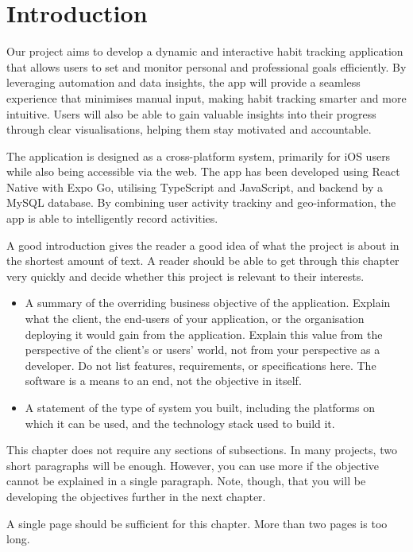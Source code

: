 \chapter{Introduction}
\label{chap:introduction}
Our project aims to develop a dynamic and interactive habit tracking application that allows users to set and monitor personal and professional goals efficiently. By leveraging automation and data insights, the app will provide a seamless experience that minimises manual input, making habit tracking smarter and more intuitive. Users will also be able to gain valuable insights into their progress through clear visualisations, helping them stay motivated and accountable.

The application is designed as a cross-platform system, primarily for iOS users while also being accessible via the web. The app has been developed using React Native with Expo Go, utilising TypeScript and JavaScript, and backend by a MySQL database. By combining user activity trackiny and geo-information, the app is able to intelligently record activities.


\begin{expectations}
A good introduction gives the reader a good idea of what the project is about in the shortest amount of text.  A reader should be able to get through this chapter very quickly and decide whether this project is relevant to their interests.
\begin{itemize}
\item A summary of the overriding business objective of the application.  Explain what the client, the end-users of your application, or the organisation deploying it would gain from the application.  Explain this value from the perspective of the client's or users' world, not from your perspective as a developer.   Do not list features, requirements, or specifications here.  The software is a means to an end, not the objective in itself.
\item A statement of the type of system you built, including the platforms on which it can be used, and the technology stack used to build it.
\end{itemize}
This chapter does not require any sections of subsections.  In many projects, two short paragraphs will be enough.  However, you can use more if the objective cannot be explained in a single paragraph.  Note, though, that you will be developing the objectives further in the next chapter.
\end{expectations}

\begin{length}
A single page should be sufficient for this chapter.  More than two pages is too long.
\end{length}
